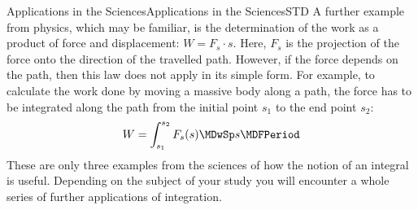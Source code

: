 \begin{MXContent}{Applications in the Sciences}{Applications in the Sciences}{STD}
A further example from physics, which may be familiar, is the determination 
of the work as a product of force and displacement: $W = F_s \cdot s$. Here, $F_s$ is the projection 
of the force onto the direction of the travelled path. However, if the force depends on the path, then this
law does not apply in its simple form. For example, to calculate the work done by moving  
a massive body along a path, the force has to be integrated along the path from the initial point 
$s_1$ to the end point $s_2$:
%
\begin{eqnarray*}
W = \int_{s_1}^{s_2}F_s(s) \MDwSp s \MDFPeriod
\end{eqnarray*}
%
These are only three examples from the sciences of how the notion of an 
integral is useful. Depending on the subject of your study you will encounter a whole 
series of further applications of integration.
\end{MXContent}




